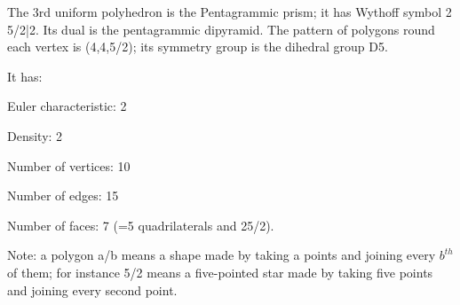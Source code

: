 The 3rd uniform polyhedron is the Pentagrammic prism; it has Wythoff symbol 2 5/2|2. Its dual is the pentagrammic dipyramid. The pattern of polygons round each vertex is (4,4,5/2); its symmetry group is the dihedral group D5.\par
It has:\par
Euler characteristic: 2\par
Density: 2\par
Number of vertices: 10\par
Number of edges:  15\par
Number of faces: 7 (=5 quadrilaterals and 2{5/2}).\par
Note: a polygon a/b means a shape made by taking a points and joining every $b^{th}$  of them; for instance 5/2 means a five-pointed star made by taking five points and joining every second point.